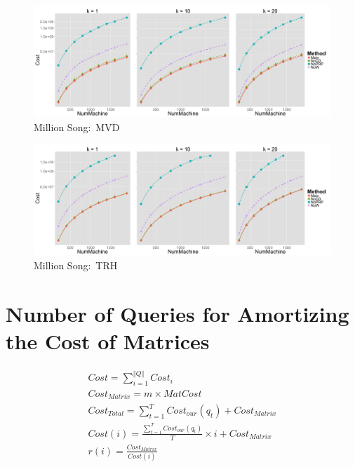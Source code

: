 \begin{figure}[htpb!]
  \centering
  \includegraphics[width=1.0\linewidth]{exp/in/mvd.png}
  \caption{Million Song:~MVD}
  \label{fig:in_mvd}
\end{figure}

\begin{figure}[htpb!]
  \centering
  \includegraphics[width=1.0\linewidth]{exp/in/trh.png}
  \caption{Million Song:~TRH}
  \label{fig:in_trh}
\end{figure}







\section{Number of Queries for Amortizing the Cost of Matrices} %
\label{s:number_of_queries_for_amortizing_the_cost_of_matrices}


\begin{equation}
\begin{aligned}
	Cost = \sum^{\Vert Q\Vert}_{i=1}{Cost_i} \\
	Cost_{Matrix} = m\times MatCost \\
	Cost_{Total} = \sum_{t=1}^T{Cost_{our}(q_t)} + Cost_{Matrix} \\
	Cost(i) = \frac{\sum_{t=1}^T{Cost_{our}(q_t)}}{T}\times i + Cost_{Matrix} \\
	r(i)=\frac{Cost_{Matrix}}{Cost(i)}
\end{aligned}
\end{equation}

